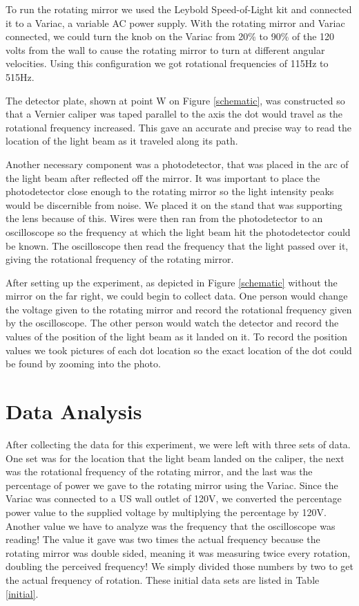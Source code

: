 \documentclass[aps,prl,10pt,twocolumn,floatfix]{revtex4-2}
\begin{document}
To run the rotating mirror we used the  Leybold Speed-of-Light kit and connected it to a Variac, a variable AC power supply.
With the rotating mirror and Variac connected, we could turn the knob on the Variac from 20\% to 90\% of the 120 volts from the wall to cause the rotating mirror to turn at different angular velocities. 
Using this configuration we got rotational frequencies of 115Hz to 515Hz. 

The detector plate, shown at point W on Figure \ref{schematic}, was constructed so that a Vernier caliper was taped parallel to the axis the dot would travel as the rotational frequency increased.
This gave an accurate and precise way to read the location of the light beam as it traveled along its path. 

Another necessary component was a photodetector, that was placed in the arc of the light beam after reflected off the mirror. 
It was important to place the photodetector close enough to the rotating mirror so the light intensity peaks would be discernible from noise. 
We placed it on the stand that was supporting the lens because of this.
Wires were then ran from the photodetector to an oscilloscope so the frequency at which the light beam hit the photodetector could be known.
The oscilloscope then read the frequency that the light passed over it, giving the rotational frequency of the rotating mirror. 

After setting up the experiment, as depicted in Figure \ref{schematic} without the mirror on the far right, we could begin to collect data. 
One person would change the voltage given to the rotating mirror and record the rotational frequency given by the oscilloscope.
The other person would watch the detector and record the values of the position of the light beam as it landed on it. 
To record the position values we took pictures of each dot location so the exact location of the dot could be found by zooming into the photo.


\section{Data Analysis}
After collecting the data for this experiment, we were left with three sets of data.
One set was for the location that the light beam landed on the caliper, the next was the rotational frequency of the rotating mirror, and the last was the percentage of power we gave to the rotating mirror using the Variac.
Since the Variac was connected to a US wall outlet of 120V, we converted the percentage power value to the supplied voltage by multiplying the percentage by 120V.
Another value we have to analyze was the frequency that the oscilloscope was reading!
The value it gave was two times the actual frequency because the rotating mirror was double sided, meaning it was measuring twice every rotation, doubling the perceived frequency!
We simply divided those numbers by two to get the actual frequency of rotation. 
These initial data sets are listed in Table \ref{initial}.
\end{document}
